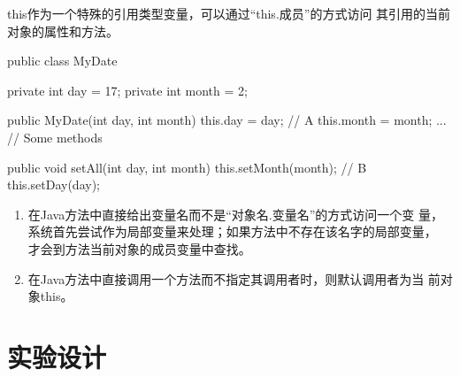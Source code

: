 this作为一个特殊的引用类型变量，可以通过“{\Red this.成员}”的方式访问
其引用的当前对象的属性和方法。

\begin{javaCode}
  public class MyDate {
    private int day = 17;
    private int month = 2;

    public MyDate(int day, int month) {
      this.day = day; // A
      this.month = month;
    }
    ... // Some methods 

    public void setAll(int day, int month) {
      this.setMonth(month); // B
      this.setDay(day);
    }
  }
\end{javaCode}


\begin{enumerate}
\item 在Java方法中直接给出变量名而不是“对象名.变量名”的方式访问一个变
  量，系统首先尝试作为局部变量来处理；如果方法中不存在该名字的局部变量，
  才会到方法当前对象的成员变量中查找。
\item 在Java方法中直接调用一个方法而不指定其调用者时，则默认调用者为当
  前对象this。
\end{enumerate}

\newpage
\section*{实验设计}
\sline